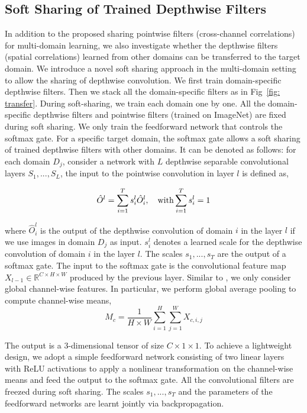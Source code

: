 \documentclass[letterpaper]{article} \usepackage{aaai19}  \usepackage{times}  \usepackage{helvet}  \usepackage{courier}  \usepackage{url}  \usepackage{graphicx}  \usepackage{amssymb}
\begin{document}
\subsection{Soft Sharing of Trained Depthwise Filters}
In addition to the proposed sharing pointwise filters (cross-channel correlations) for multi-domain learning, we also investigate whether the depthwise filters (spatial correlations) learned from other domains can be transferred to the target domain. We introduce a novel soft sharing approach in the multi-domain setting to allow the sharing of depthwise convolution. We first train domain-specific depthwise filters. Then we stack all the domain-specific filters as in Fig~\ref{fig: transfer}. During soft-sharing, we train each domain one by one. All the domain-specific depthwise filters and pointwise filters (trained on ImageNet) are fixed during soft sharing. We only train the feedforward network that controls the softmax gate. For a specific target domain, the softmax gate allows a soft sharing of trained depthwise filters with other domains. It can be denoted as follows: for each domain $D_j$, consider a network with $L$ depthwise separable convolutional layers $S_1 , . . . , S_L$, the input to the pointwise convolution in layer $l$  is defined as,

\begin{equation}
    \hat{O}^l = \sum_{i=1}^{T} s^l_i \hat{O}^l_i, \quad\textnormal{with} \sum_{i=1}^T s^l_i = 1
\end{equation}

\noindent where $\hat{O}^l_i$ is the output of the depthwise convolution of domain $i$ in the layer $l$ if we use images in domain $D_j$ as input. $s^l_i$ denotes a learned scale for the depthwise convolution of domain $i$ in the layer $l$.  The scales $s_1, ..., s_T$ are the output of a softmax gate. The input to the softmax gate is the convolutional feature map $X_{l-1} \in \mathbb{R}^{C \times H \times W}$ produced by the previous layer. Similar to \cite{veit2017convolutional},  we only consider global channel-wise features. In particular, we perform global average pooling to compute channel-wise means,
\begin{equation}
    M_c = \frac{1}{H \times W} \sum_{i=1}^{H}\sum_{j=1}^{W}X_{c,i,j}
\end{equation}

The output is a 3-dimensional tensor of size $C \times 1 \times 1$. To achieve a lightweight design, we adopt a simple feedforward network consisting of two linear layers with ReLU activations to apply a nonlinear transformation on the channel-wise means and feed the output to the softmax gate. All the convolutional filters are freezed during soft sharing. The scales $s_1, ..., s_T$ and the parameters of the feedforward networks are learnt jointly via backpropagation.
\end{document}
